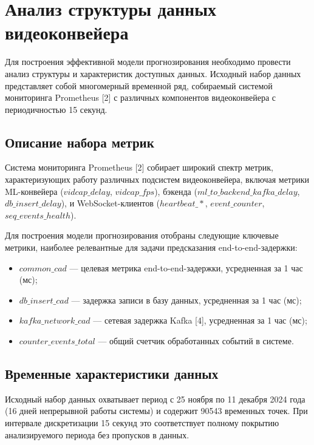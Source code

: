 \section{Анализ структуры данных видеоконвейера}

\hspace*{1.25cm}Для построения эффективной модели прогнозирования необходимо провести анализ структуры и характеристик доступных данных. Исходный набор данных представляет собой многомерный временной ряд, собираемый системой мониторинга Prometheus [2] с различных компонентов видеоконвейера с периодичностью 15 секунд.

\subsection{Описание набора метрик}

\hspace*{1.25cm}Система мониторинга Prometheus [2] собирает широкий спектр метрик, характеризующих работу различных подсистем видеоконвейера, включая метрики ML-конвейера ($vidcap\_delay$, $vidcap\_fps$), бэкенда ($ml\_to\_backend\_kafka\_delay$, $db\_insert\_delay$), и WebSocket-клиентов ($heartbeat\_*$, $event\_counter$, $seq\_events\_health$).

\hspace*{1.25cm}Для построения модели прогнозирования отобраны следующие ключевые метрики, наиболее релевантные для задачи предсказания end-to-end-задержки:

\begin{itemize}
	\item $common\_cad$ --- целевая метрика end-to-end-задержки, усредненная за 1 час (мс);
	\item $db\_insert\_cad$ --- задержка записи в базу данных, усредненная за 1 час (мс);
	\item $kafka\_network\_cad$ --- сетевая задержка Kafka [4], усредненная за 1 час (мс);
	\item $counter\_events\_total$ --- общий счетчик обработанных событий в системе.
\end{itemize}

\subsection{Временные характеристики данных}

\hspace*{1.25cm}Исходный набор данных охватывает период с 25 ноября по 11 декабря 2024 года (16 дней непрерывной работы системы) и содержит 90543 временных точек. При интервале дискретизации 15 секунд это соответствует полному покрытию анализируемого периода без пропусков в данных.

